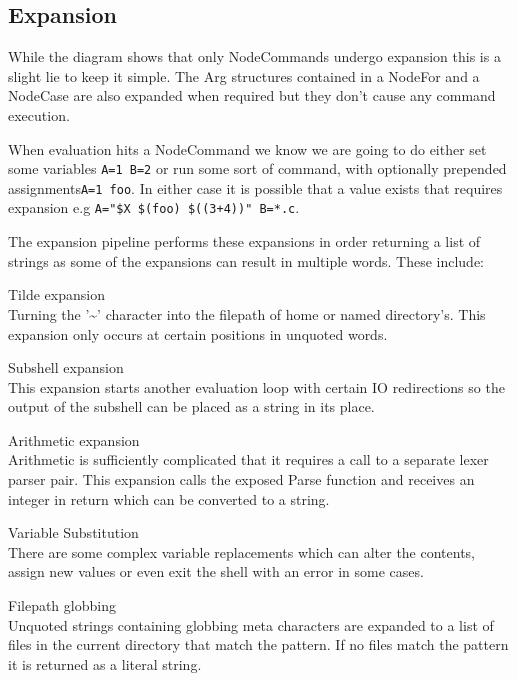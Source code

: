 \subsection{Expansion}
While the diagram shows that only NodeCommands undergo expansion this is a slight lie to keep it simple.
The Arg structures contained in a NodeFor and a NodeCase are also expanded when required but they don't cause any command execution.

When evaluation hits a NodeCommand we know we are going to do either set some variables \verb!A=1 B=2! or run some sort of command, with optionally prepended assignments\verb!A=1 foo!.
In either case it is possible that a value exists that requires expansion e.g \verb!A="$X $(foo) $((3+4))" B=*.c!.

The expansion pipeline performs these expansions in order returning a list of strings as some of the expansions can result in multiple words.
These include:
\begin{description*}
	\item Tilde expansion \hfill \\
    	Turning the '\textasciitilde' character into the filepath of home or named directory's.
    	This expansion only occurs at certain positions in unquoted words.
    \item Subshell expansion \hfill \\
    	This expansion starts another evaluation loop with certain IO redirections so the output of the subshell can be placed as a string in its place.
	\item Arithmetic expansion \hfill \\
    	Arithmetic is sufficiently complicated that it requires a call to a separate lexer parser pair.
        This expansion calls the exposed Parse function and receives an integer in return which can be converted to a string.
    \item Variable Substitution \hfill \\
    	There are some complex variable replacements which can alter the contents, assign new values or even exit the shell with an error in some cases.
	\item Filepath globbing \hfill \\
    	Unquoted strings containing globbing meta characters are expanded to a list of files in the current directory that match the pattern.
        If no files match the pattern it is returned as a literal string.
\end{description*}

